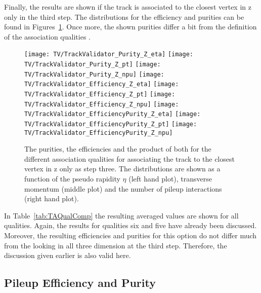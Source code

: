 Finally, the results are shown if the track is associated to the closest vertex in z only in the third step. The distributions for the efficiency and purities can be found in Figures~\ref{plot:TASEFRDQZSignal}. Once more, the shown purities differ a bit from the definition of the association qualities .

\begin{figure}[h!t]
  \centering
  \texttt{[image: TV/TrackValidator\_Purity\_Z\_eta]}
  \texttt{[image: TV/TrackValidator\_Purity\_Z\_pt]}
  \texttt{[image: TV/TrackValidator\_Purity\_Z\_npu]}
  \newline
  \texttt{[image: TV/TrackValidator\_Efficiency\_Z\_eta]}
  \texttt{[image: TV/TrackValidator\_Efficiency\_Z\_pt]}
  \texttt{[image: TV/TrackValidator\_Efficiency\_Z\_npu]}
  \newline
  \texttt{[image: TV/TrackValidator\_EfficiencyPurity\_Z\_eta]}
  \texttt{[image: TV/TrackValidator\_EfficiencyPurity\_Z\_pt]}
  \texttt{[image: TV/TrackValidator\_EfficiencyPurity\_Z\_npu]}
  \caption[Purities, efficiencies and their product for the different quality of the association map with associating to the closest vertex in z only as third step]{The purities, the efficiencies and the product of both for the different association qualities for associating the track to the closest vertex in z only as step three. The distributions are shown as a function of the pseudo rapidity $\eta$ (left hand plot), transverse momentum (middle plot) and the number of pileup interactions (right hand plot). \label{plot:TASEFRDQZSignal}}
\end{figure}

In Table~\ref{tab:TAQualComp} the resulting averaged values are shown for all qualities. Again, the results for qualities six and five have already been discussed. Moreover, the resulting efficiencies and purities for this option do not differ much from the looking in all three dimension at the third step. Therefore, the discussion given earlier is also valid here. 


\newpage

\subsection{Pileup Efficiency and Purity \label{sec:TAPUEFR}}

